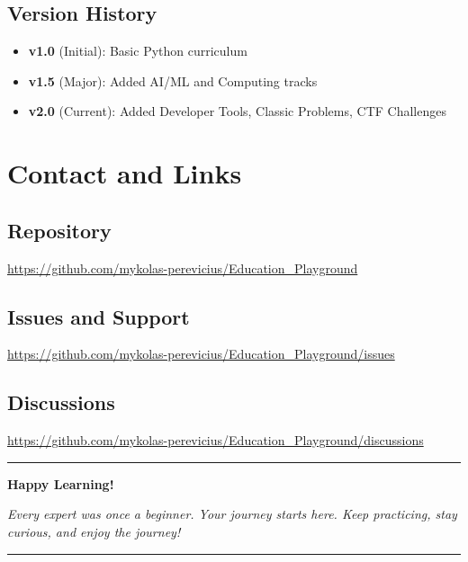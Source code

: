 \documentclass[11pt,letterpaper]{article}
\begin{document}
\subsection{Version History}
\begin{itemize}[leftmargin=*]
    \item \textbf{v1.0} (Initial): Basic Python curriculum
    \item \textbf{v1.5} (Major): Added AI/ML and Computing tracks
    \item \textbf{v2.0} (Current): Added Developer Tools, Classic Problems, CTF Challenges
\end{itemize}

\section{Contact and Links}

\subsection{Repository}
\url{https://github.com/mykolas-perevicius/Education_Playground}

\subsection{Issues and Support}
\url{https://github.com/mykolas-perevicius/Education_Playground/issues}

\subsection{Discussions}
\url{https://github.com/mykolas-perevicius/Education_Playground/discussions}

\vspace{1cm}
\begin{center}
\rule{0.5\textwidth}{0.4pt}

\vspace{0.5cm}
{\large\textbf{Happy Learning!}}

\vspace{0.3cm}
{\itshape Every expert was once a beginner.
Your journey starts here. Keep practicing, stay curious,
and enjoy the journey!}

\vspace{0.5cm}
\rule{0.5\textwidth}{0.4pt}
\end{center}
\end{document}
